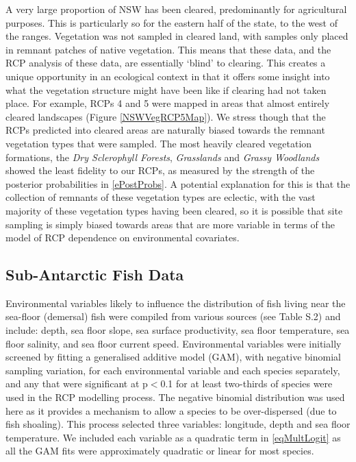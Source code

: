 \documentclass{statsoc}
\begin{document}
A very large proportion of NSW has been cleared, predominantly for agricultural purposes. This is particularly so for the eastern half of the state, to the west of the ranges. Vegetation was not sampled in cleared land, with samples only placed in remnant patches of native vegetation. This means that these data, and the RCP analysis of these data, are essentially `blind' to clearing. This creates a unique opportunity in an ecological context in that it offers some insight into what the vegetation structure might have been like if clearing had not taken place. For example, RCPs 4 and 5 were mapped in areas that almost entirely cleared landscapes (Figure \ref{NSWVegRCP5Map}). We stress though that the RCPs predicted into cleared areas are naturally biased towards the remnant vegetation types that were sampled. The most heavily cleared vegetation formations, the \textit{Dry Sclerophyll Forests}, \textit{Grasslands} and \textit{Grassy Woodlands} \citep{kei04} showed the least fidelity to our RCPs, as measured by the strength of the posterior probabilities in \eqref{ePostProbs}. A potential explanation for this is that the collection of remnants of these vegetation types are eclectic, with the vast majority of these vegetation types having been cleared, so it is possible that site sampling is simply biased towards areas that are more variable in terms of the model of RCP dependence on environmental covariates.

\subsection{Sub-Antarctic Fish Data}\label{SectFishAnal}

Environmental variables likely to influence the distribution of fish living near the sea-floor (demersal) fish were compiled from various sources (see Table S.2) and include: depth, sea floor slope, sea surface productivity, sea floor temperature, sea floor salinity, and sea floor current speed. Environmental variables were initially screened by fitting a generalised additive model (GAM), with negative binomial sampling variation, for each environmental variable and each species separately, and any that were significant at p$<$0.1 for at least two-thirds of species were used in the RCP modelling process. The negative binomial distribution was used here as it provides a mechanism to allow a species to be over-dispersed (due to fish shoaling). This process selected three variables: longitude, depth and sea floor temperature. We included each variable as a quadratic term in \eqref{eqMultLogit} as all the GAM fits were approximately quadratic or linear for most species.
\end{document}
